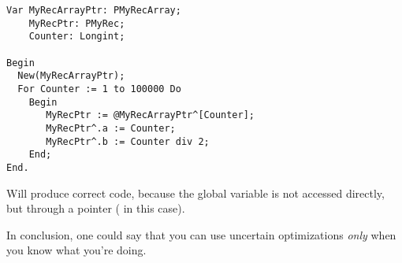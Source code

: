 \documentclass{report}
\begin{document}
\begin{enumerate}
\begin{verbatim}
Var MyRecArrayPtr: PMyRecArray;
    MyRecPtr: PMyRec;
    Counter: Longint;

Begin
  New(MyRecArrayPtr);
  For Counter := 1 to 100000 Do
    Begin
       MyRecPtr := @MyRecArrayPtr^[Counter];
       MyRecPtr^.a := Counter;
       MyRecPtr^.b := Counter div 2;
    End;
End.
\end{verbatim}
Will produce correct code, because the global variable 
is not accessed directly, but through a pointer ( in this
case). 

In conclusion, one could say that you can use uncertain optimizations {\em
only} when you know what you're doing.
\end{enumerate} 
\end{document}
